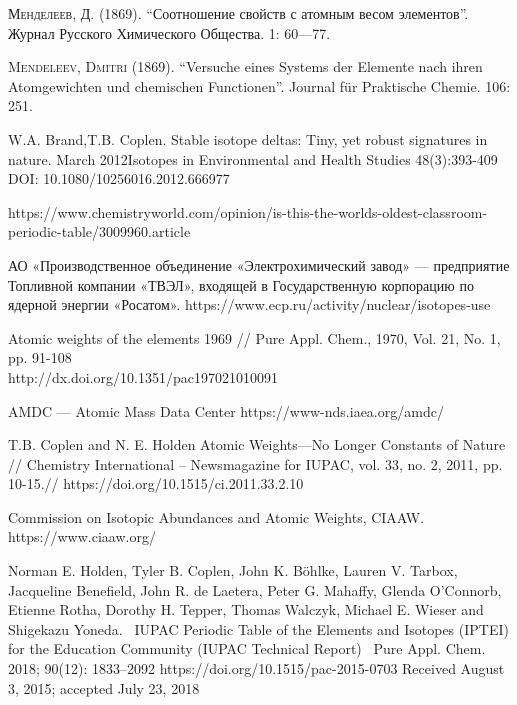 \documentclass[a5paper,openany]{book}
\begin{document}
\begin{thebibliography}{00}
\textsc{Менделеев, Д.} (1869). “Соотношение свойств с атомным весом элементов”. Журнал Русского Химического Общества. 1: 60—77.

\textsc{Mendeleev, Dmitri} (1869). “Versuche eines Systems der Elemente nach ihren Atomgewichten und chemischen Functionen”. Journal für Praktische Chemie. 106: 251.

W.A. Brand,T.B. Coplen.
Stable isotope deltas: Tiny, yet robust signatures in nature. March 2012Isotopes in Environmental and Health Studies 48(3):393-409 
DOI: 10.1080/10256016.2012.666977

https://www.chemistryworld.com/opinion/is-this-the-worlds-oldest-classroom-periodic-table/3009960.article

АО «Производственное объединение «Электрохимический завод» — предприятие Топливной компании «ТВЭЛ», входящей в Государственную корпорацию по ядерной энергии «Росатом».
https://www.ecp.ru/activity/nuclear/isotopes-use

Atomic weights of the elements 1969 // Pure Appl. Chem., 1970, Vol. 21, No. 1, pp. 91-108 \\ http://dx.doi.org/10.1351/pac197021010091

 AMDC --- Atomic Mass Data Center
https://www-nds.iaea.org/amdc/


T.B. Coplen and N. E. Holden
Atomic Weights—No Longer Constants of Nature //
Chemistry International -- Newsmagazine for IUPAC, vol. 33, no. 2, 2011, pp. 10-15.// https://doi.org/10.1515/ci.2011.33.2.10

Commission on Isotopic Abundances and Atomic Weights, CIAAW.
https://www.ciaaw.org/

 Norman E. Holden, Tyler B. Coplen, John K. B\"{o}hlke, Lauren V. Tarbox, Jacqueline Benefield, John R. de Laetera, Peter G. Mahaffy, Glenda O’Connorb, Etienne Rotha,
Dorothy H. Tepper, Thomas Walczyk, Michael E. Wieser and Shigekazu Yoneda. \
IUPAC Periodic Table of the Elements and Isotopes (IPTEI) for the Education Community
(IUPAC Technical Report) \ Pure Appl. Chem. 2018; 90(12): 1833–2092
https://doi.org/10.1515/pac-2015-0703
Received August 3, 2015; accepted July 23, 2018


\end{thebibliography}
\end{document}
